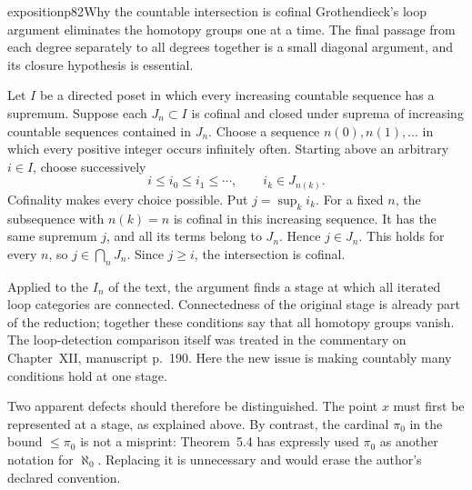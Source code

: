 \begin{dcomment}{exposition}{p82}{Why the countable intersection is cofinal}
Grothendieck's loop argument eliminates the homotopy groups one at a time. The final passage from each degree separately to all degrees together is a small diagonal argument, and its closure hypothesis is essential.

Let $I$ be a directed poset in which every increasing countable sequence has a supremum. Suppose each $J_n\subset I$ is cofinal and closed under suprema of increasing countable sequences contained in $J_n$. Choose a sequence $n(0),n(1),\ldots$ in which every positive integer occurs infinitely often. Starting above an arbitrary $i\in I$, choose successively
\[
 i\leq i_0\leq i_1\leq\cdots,
 \qquad i_k\in J_{n(k)}.
\]
Cofinality makes every choice possible. Put $j=\sup_k i_k$. For a fixed $n$, the subsequence with $n(k)=n$ is cofinal in this increasing sequence. It has the same supremum $j$, and all its terms belong to $J_n$. Hence $j\in J_n$. This holds for every $n$, so $j\in\bigcap_nJ_n$. Since $j\geq i$, the intersection is cofinal.

Applied to the $I_n$ of the text, the argument finds a stage at which all iterated loop categories are connected. Connectedness of the original stage is already part of the reduction; together these conditions say that all homotopy groups vanish. The loop-detection comparison itself was treated in the commentary on Chapter~XII, manuscript p.~190. Here the new issue is making countably many conditions hold at one stage.

Two apparent defects should therefore be distinguished. The point $x$ must first be represented at a stage, as explained above. By contrast, the cardinal $\pi_0$ in the bound $\leq\pi_0$ is not a misprint: Theorem~5.4 has expressly used $\pi_0$ as another notation for $\aleph_0$. Replacing it is unnecessary and would erase the author's declared convention.
\end{dcomment}

